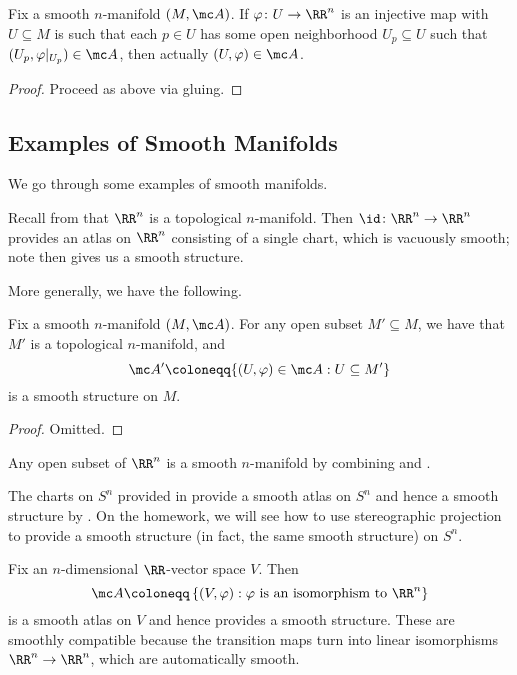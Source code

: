 \documentclass[../notes.tex]{subfiles}
\begin{document}
\begin{lemma}
	Fix a smooth $n$-manifold $(M,\mc A)$. If $\varphi\colon U\to\RR^n$ is an injective map with $U\subseteq M$ is such that each $p\in U$ has some open neighborhood $U_p\subseteq U$ such that $(U_p,\varphi|_{U_p})\in\mc A$, then actually $(U,\varphi)\in\mc A$.
\end{lemma}
\begin{proof}
	Proceed as above via gluing.
\end{proof}

\subsection{Examples of Smooth Manifolds}
We go through some examples of smooth manifolds.
\begin{example} \label{ex:rn-sm-manifold}
	Recall from  that $\RR^n$ is a topological $n$-manifold. Then $\id\colon\RR^n\to\RR^n$ provides an atlas on $\RR^n$ consisting of a single chart, which is vacuously smooth; note  then gives us a smooth structure.
\end{example}
More generally, we have the following.
\begin{proposition} \label{prop:open-sm-manifold}
	Fix a smooth $n$-manifold $(M,\mc A)$. For any open subset $M'\subseteq M$, we have that $M'$ is a topological $n$-manifold, and
	\[\mc A'\coloneqq\{(U,\varphi)\in\mc A:U\subseteq M'\}\]
	is a smooth structure on $M$.
\end{proposition}
\begin{proof}
	Omitted.
\end{proof}
\begin{example}
	Any open subset of $\RR^n$ is a smooth $n$-manifold by combining  and .
\end{example}
\begin{example}
	The charts on $S^n$ provided in  provide a smooth atlas on $S^n$ and hence a smooth structure by . On the homework, we will see how to use stereographic projection to provide a smooth structure (in fact, the same smooth structure) on $S^n$.
\end{example}
\begin{example}
	Fix an $n$-dimensional $\RR$-vector space $V$. Then
	\[\mc A\coloneqq\left\{(V,\varphi):\varphi\text{ is an isomorphism to }\RR^n\right\}\]
	is a smooth atlas on $V$ and hence provides a smooth structure. These are smoothly compatible because the transition maps turn into linear isomorphisms $\RR^n\to\RR^n$, which are automatically smooth.
\end{example}
\end{document}
